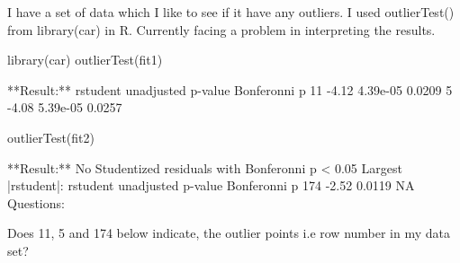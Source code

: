 

I have a set of data which I like to see if it have any outliers. I used outlierTest() from library(car) in R. Currently facing a problem in interpreting the results.

library(car)
outlierTest(fit1)   

**Result:**
rstudent unadjusted p-value Bonferonni p
11    -4.12           4.39e-05       0.0209
5     -4.08           5.39e-05       0.0257

outlierTest(fit2)   

**Result:**
No Studentized residuals with Bonferonni p < 0.05
Largest |rstudent|:
rstudent unadjusted p-value Bonferonni p
174    -2.52             0.0119           NA
Questions:

Does 11, 5 and 174 below indicate, the outlier points i.e row number in my data set?